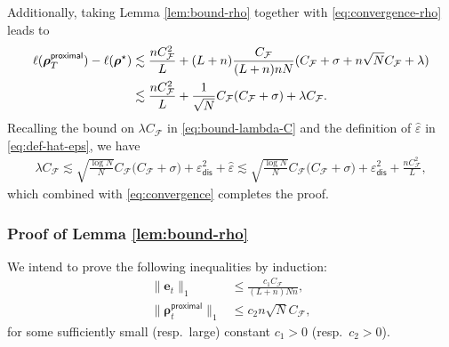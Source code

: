 \documentclass[english]{article}
\begin{document}
Additionally, taking Lemma \ref{lem:bound-rho} together with  \eqref{eq:convergence-rho} leads to
%
\begin{align} \label{eq:convergence}
\ell({\bm \rho}_T^{\mathsf{proximal}}) -\ell({\bm \rho}^{\star})
&\lesssim \frac{nC_{\mathcal{F}}^2}{L} + (L+n)\frac{C_{\mathcal{F}}}{(L+n)nN}(C_{\mathcal{F}} + \sigma + n\sqrt{N}C_{\mathcal{F}} + \lambda)\notag\\
&\lesssim \frac{nC_{\mathcal{F}}^2}{L}+
\frac{1}{\sqrt{N}}C_{\mathcal{F}}(C_{\mathcal{F}} + \sigma) + \lambda C_{\mathcal{F}}.
\end{align}
%
Recalling the bound on $\lambda C_\mathcal{F}$ in \eqref{eq:bound-lambda-C} and the definition of $\widehat{\varepsilon}$ in \eqref{eq:def-hat-eps}, we have
%
\begin{align*}
\lambda C_\mathcal{F}\lesssim \sqrt{\frac{\log N}{N}}C_{\mathcal{F}}\Big(C_{\mathcal{F}} + \sigma\Big) + \varepsilon_{\mathsf{dis}}^2 + \widehat{\varepsilon} \lesssim \sqrt{\frac{\log N}{N}}C_{\mathcal{F}}\Big(C_{\mathcal{F}} + \sigma\Big) + \varepsilon_{\mathsf{dis}}^2 + \frac{n C_\mathcal{F}^2}{L},
\end{align*}
%
which combined with \eqref{eq:convergence} completes the proof.

\subsubsection{Proof of Lemma \ref{lem:bound-rho}}
\label{sec:proof-lem:bound-rho}
We intend to prove the following inequalities by induction:
%
\begin{align}
\|{\bm e}_t\|_1&\le \frac{c_1C_{\mathcal{F}}}{(L+n)Nn},\label{eq:lem-bound-e}\\
\|{\bm \rho}_t^{\mathsf{proximal}}\|_1&\le c_2n\sqrt{N}C_{\mathcal{F}},\label{eq:lem-bound-rho}
\end{align}
for some sufficiently small (resp.~large) constant $c_1>0$ (resp.~$c_2>0$).
\end{document}
